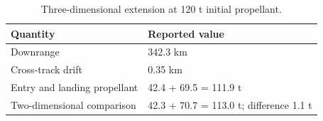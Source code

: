 \begin{table}[htbp]
\caption{Three-dimensional extension at 120 t initial propellant.}
\label{tab:src10}
\small
\setlength{\tabcolsep}{3.5pt}
\begin{tabularx}{\linewidth}{@{}p{.36\linewidth}X@{}}
\toprule
Quantity & Reported value \\
\midrule
Downrange & 342.3 km \\
Cross-track drift & 0.35 km \\
Entry and landing propellant & 42.4 + 69.5 = 111.9 t \\
Two-dimensional comparison & 42.3 + 70.7 = 113.0 t; difference 1.1 t \\
\bottomrule
\end{tabularx}
\par{}
\end{table}
